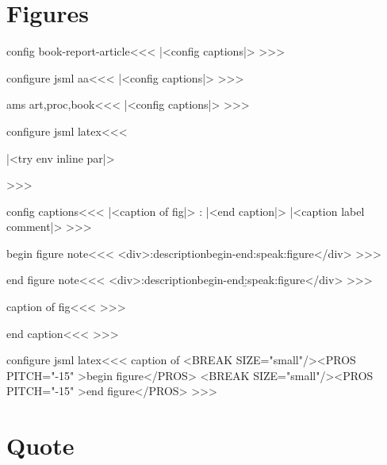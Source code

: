 \section{Figures}


\<config book-report-article\><<<
|<config captions|>
>>>

\<configure jsml aa\><<<   
|<config captions|>
>>>

\<ams art,proc,book\><<<
|<config captions|>
>>>





\<configure jsml latex\><<<
   {\IgnorePar\EndP
    \bgroup {}%
   }
   {\egroup
    \IgnorePar\EndP{}%
    |<try env inline par|>\par}
   {}{}
>>>


\<config captions\><<<
   {\IgnorePar\EndP
    |<caption of fig|>}
   {: }
   {|<end caption|>} 
   {|<caption label comment|>}
>>>


\<begin figure note\><<<
<div>\add:description{begin-end}{\a:speak:figure}</div>%
>>>


\<end figure note\><<<
<div>\add:description{begin-end}{\b:speak:figure}</div>%
>>>

\<caption of fig\><<<
%
>>>

\<end caption\><<<
>>>

\<configure jsml latex\><<<
   {}
   {}
   {caption of}
   {<BREAK
       SIZE="small"/><PROS PITCH="-15" >begin figure</PROS>}
   {<BREAK
       SIZE="small"/><PROS PITCH="-15" >end figure</PROS>}
>>>

\section{Quote}


